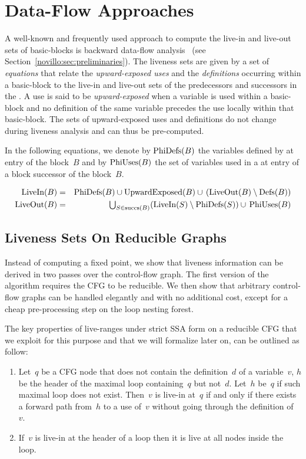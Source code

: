 \section{Data-Flow Approaches}
\label{sec:data-flow}

A well-known and frequently used approach to compute the live-in and live-out sets of basic-blocks is backward data-flow analysis~ (see Section~\ref{novillo:sec:preliminaries}).
The liveness sets are given by a set of \emph{equations} that relate the \emph{upward-exposed uses} and the \emph{definitions} occurring within a basic-block to the live-in and live-out sets of the predecessors and successors in the \@CFG.
A use is said to be \emph{upward-exposed} when a variable is used within a basic-block and no definition of the same variable precedes the use locally within that basic-block.
The sets of upward-exposed uses and definitions do not change during liveness analysis and can thus be pre-computed.

In the following equations, we denote by $\textrm{PhiDefs}(B)$ the variables defined by \phifuns at entry of the block~$B$ and by $\textrm{PhiUses}(B)$ the set of variables used in a \phifun at entry of a block successor of the block~$B$.

\begin{eqnarray*}
	\textrm{LiveIn}(B) & = & \textrm{PhiDefs}(B) \cup \textrm{UpwardExposed}(B) \cup \,(\textrm{LiveOut}(B)\setminus \textrm{Defs}(B)) \\
	\textrm{LiveOut}(B)& = &
	\textstyle \bigcup_{S \in \textrm{succs}(B)} (\textrm{LiveIn}(S) \setminus
	\textrm{PhiDefs}(S)) \cup\, \textrm{PhiUses}(B)
\end{eqnarray*}

\subsection{Liveness Sets On Reducible Graphs}
\label{sec:forreducible}

Instead of computing a fixed point, we show that liveness information can be derived in two passes over the control-flow graph.
The first version of the algorithm requires the CFG to be reducible.
We then show that arbitrary control-flow graphs can be handled elegantly and with no additional cost, except for a cheap pre-processing step on the loop nesting forest.

The key properties of live-ranges under strict SSA form on a reducible CFG that we exploit for this purpose and that we will formalize later on, can be outlined as follow:
\begin{enumerate}
\item
	Let~$q$ be a CFG node that does not contain the definition~$d$ of a variable~$v$, $h$ be the header of the maximal loop containing~$q$ but not~$d$.
	Let~$h$ be~$q$ if such maximal loop does not exist.
	Then~$v$ is live-in at~$q$ if and only if there exists a forward path from~$h$ to a use of~$v$ without going through the definition of~$v$.
\item
	If~$v$ is live-in at the header of a loop then it is live at all nodes inside the loop.
\end{enumerate}

